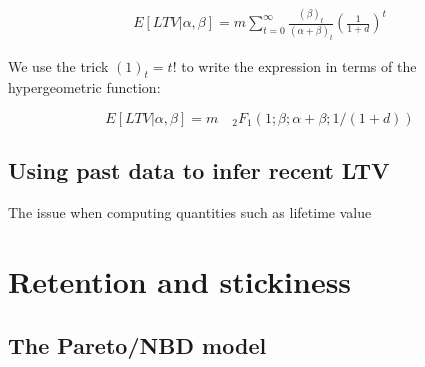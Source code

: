 \documentclass{tufte-book}
\begin{document}
\begin{align*}
  E\left[LTV|\alpha, \beta\right] = m \sum_{t=0}^{\infty} \frac{(\beta)_t}{\left(\alpha+\beta\right)_t}
  \left(\frac{1}{1+d}\right)^t
\end{align*}

We use the trick $(1)_t = t!$ to write the expression in terms of the hypergeometric function:

$$
E\left[LTV | \alpha, \beta\right] = m \quad _2F_1(1; \beta; \alpha+\beta; 1/(1+d))
$$

\subsection{Using past data to infer recent LTV}

The issue when computing quantities such as lifetime value
  
\section{Retention and stickiness}
\label{sec:retention_and_stickiness}

\subsection{The Pareto/NBD model}
\label{sub:the_pareto_nbd_model}
\end{document}
